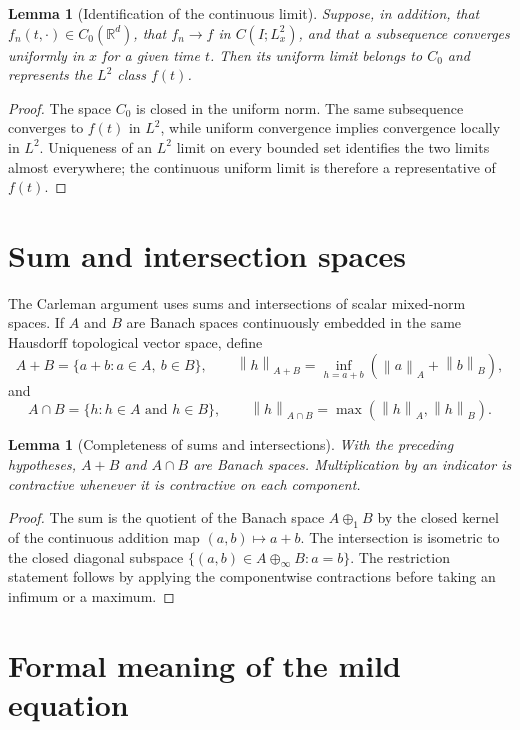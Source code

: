 \documentclass[11pt,oneside]{book}
\newtheorem{lemma}[theorem]{Lemma}
\theoremstyle{definition}
\theoremstyle{remark}
\newcommand{\R}{\mathbb R}
\newcommand{\1}{\mathbf 1}
\newcommand{\norm}[1]{\left\lVert #1\right\rVert}
\begin{document}
\begin{lemma}[Identification of the continuous limit]
\label{lem:C0-limit-identification}
Suppose, in addition, that $f_n(t,\cdot)\in C_0(\R^d)$, that
$f_n\to f$ in $C(I;L^2_x)$, and that a subsequence converges uniformly in
$x$ for a given time $t$.  Then its uniform limit belongs to $C_0$ and
represents the $L^2$ class $f(t)$.
\end{lemma}

\begin{proof}
The space $C_0$ is closed in the uniform norm.  The same subsequence converges
to $f(t)$ in $L^2$, while uniform convergence implies convergence locally in
$L^2$.  Uniqueness of an $L^2$ limit on every bounded set identifies the two
limits almost everywhere; the continuous uniform limit is therefore a
representative of $f(t)$.
\end{proof}

\section{Sum and intersection spaces}

The Carleman argument uses sums and intersections of scalar mixed-norm
spaces.  If $A$ and $B$ are Banach spaces continuously embedded in the same
Hausdorff topological vector space, define
\[
 A+B=\{a+b:a\in A,\ b\in B\},
 \qquad
 \norm h_{A+B}=\inf_{h=a+b}(\norm a_A+\norm b_B),
\]
and
\[
 A\cap B=\{h:h\in A\text{ and }h\in B\},
 \qquad
 \norm h_{A\cap B}=\max(\norm h_A,\norm h_B).
\]

\begin{lemma}[Completeness of sums and intersections]
\label{lem:sum-intersection-complete}
With the preceding hypotheses, $A+B$ and $A\cap B$ are Banach spaces.
Multiplication by an indicator is contractive whenever it is contractive on
each component.
\end{lemma}

\begin{proof}
The sum is the quotient of the Banach space $A\oplus_1B$ by the closed kernel
of the continuous addition map $(a,b)\mapsto a+b$.  The intersection is
isometric to the closed diagonal subspace
$\{(a,b)\in A\oplus_\infty B:a=b\}$.  The restriction statement follows by
applying the componentwise contractions before taking an infimum or a
maximum.
\end{proof}

\section{Formal meaning of the mild equation}
\end{document}
